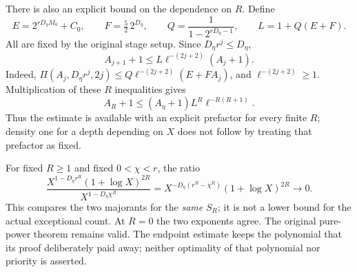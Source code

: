 There is also an explicit bound on the dependence on \(R\).
Define
\[
 E=2^{rD_\eta M_0}+C_0,\qquad F=\tfrac52\,2^{D_\eta},
 \qquad Q=\frac1{1-2^{rD_\eta-1}},\qquad L=1+Q(E+F).
\]
All are fixed by the original stage setup. Since \(D_\eta r^j\le D_\eta\),
\[
 A_{j+1}+1\le L\ell^{-(2j+2)}(A_j+1).
\]
Indeed, \(\Pi(A_j,D_\eta r^j,2j)\le
Q\ell^{-(2j+2)}(E+FA_j)\), and \(\ell^{-(2j+2)}\ge1\).
Multiplication of these \(R\) inequalities gives
\begin{equation}\label{eq:Shaik-log-prefactor}
 A_R+1\le(A_\eta+1)L^R\ell^{-R(R+1)} .
\end{equation}
Thus the estimate is available with an explicit prefactor for every
finite \(R\); density one for a depth depending on \(X\) does not follow
by treating that prefactor as fixed.

For fixed \(R\ge1\) and fixed \(0<\chi<r\), the ratio
\[
 \frac{X^{1-D_\eta r^R}(1+\log X)^{2R}}
      {X^{1-D_\eta\chi^R}}
 =X^{-D_\eta(r^R-\chi^R)}(1+\log X)^{2R}
 \longrightarrow0 .
\]
This compares the two majorants for the \emph{same} \(S_R\);
it is not a lower bound for the actual exceptional count.
At \(R=0\) the two exponents agree.
The original pure-power theorem remains valid. The endpoint estimate
keeps the polynomial that its proof deliberately paid away; neither
optimality of that polynomial nor priority is asserted.

